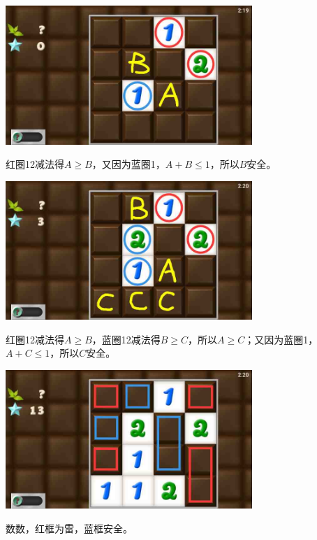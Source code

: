 \subsection{} %
\begin{center}
    \includegraphics[width=0.7\textwidth]{puzzlelow/144-1.jpg}
\end{center}
红圈12减法得$A\ge B$，又因为蓝圈1，$A+B\le 1$，所以$B$安全。
\begin{center}
    \includegraphics[width=0.7\textwidth]{puzzlelow/144-2.jpg}
\end{center}
红圈12减法得$A\ge B$，蓝圈12减法得$B\ge C$，所以$A\ge C$；又因为蓝圈1，$A+C\le 1$，所以$C$安全。
\begin{center}
    \includegraphics[width=0.7\textwidth]{puzzlelow/144-3.jpg}
\end{center}
数数，红框为雷，蓝框安全。

